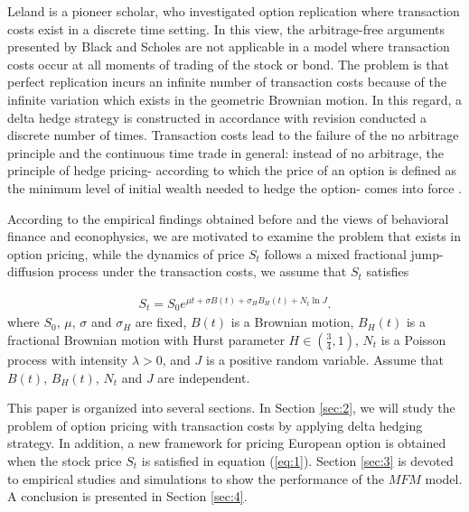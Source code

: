 \documentclass[a4paper,11pt]{amsart}
\numberwithin{equation}{section}
\theoremstyle{definition}
\theoremstyle{plain}
\theoremstyle{definition}
\newcommand{\1}{\mathbf{1}}
\begin{document}
Leland \cite{leland} is a pioneer scholar, who investigated option replication where transaction costs exist in a discrete time setting. In this view, the arbitrage-free arguments presented by Black and Scholes \cite{black} are not applicable in a model where transaction costs occur at all moments of trading of the stock or bond. The problem is that perfect replication incurs an infinite number of transaction costs because of the infinite variation which exists in the geometric Brownian motion. In this regard, a delta hedge strategy is constructed in accordance with revision conducted a discrete number of times. Transaction
costs lead to the failure of the no arbitrage principle and the continuous time trade in general: instead of no arbitrage, the principle of hedge pricing- according to which the price of an option is defined as the minimum level of initial wealth needed to hedge the option- comes into force .

According to the empirical findings obtained before and the views of behavioral finance and econophysics, we are motivated to examine the problem that exists in option pricing, while the dynamics of price  $S_t$ follows a mixed fractional jump-diffusion process under the transaction costs, we assume that $S_t$
satisfies

\begin{eqnarray}
S_t=S_0e^{\mu t+\sigma B(t)+\sigma_HB_H(t)+N_t\ln J}.
\label{eq:1}
\end{eqnarray}
where $S_0,\,\mu,\,\sigma$ and $\sigma_H$ are fixed, $B(t)$ is a Brownian motion, $B_H(t)$ is a fractional Brownian motion with Hurst parameter $H\in (\frac{3}{4},1)$, $N_t$ is a Poisson process with intensity $\lambda>0$, and $J$ is a positive random variable. Assume that $B(t),\,B_H(t),\,N_t$ and $J$ are independent.

This paper is organized into several sections. In Section \ref{sec:2}, we will study the problem of option pricing with transaction costs by applying delta hedging strategy. In addition, a new framework for pricing European option is obtained when the stock price $S_t$ is satisfied in equation  (\ref{eq:1}). Section \ref{sec:3} is devoted to empirical
studies and simulations to show the performance of the $MFM$ model. A conclusion is presented in Section \ref{sec:4}.\\
\end{document}
